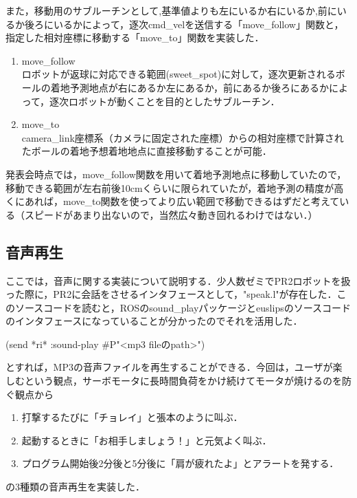 \documentclass[10pt, oneside, titlepage]{ltjarticle}  %
\begin{document}
  また，移動用のサブルーチンとして,基準値よりも左にいるか右にいるか,前にいるか後ろにいるかによって，逐次cmd\_velを送信する「move\_follow」関数と，指定した相対座標に移動する「move\_to」関数を実装した．
  \begin{enumerate}
    \item move\_follow \\
      ロボットが返球に対応できる範囲(sweet\_spot)に対して，逐次更新されるボールの着地予測地点が右にあるか左にあるか，前にあるか後ろにあるかによって，逐次ロボットが動くことを目的としたサブルーチン．
      
    \item move\_to \\
      camera\_link座標系（カメラに固定された座標）からの相対座標で計算されたボールの着地予想着地地点に直接移動することが可能．
  \end{enumerate}

  発表会時点では，move\_follow関数を用いて着地予測地点に移動していたので，移動できる範囲が左右前後10cmくらいに限られていたが，着地予測の精度が高くにあれば，move\_to関数を使ってより広い範囲で移動できるはずだと考えている（スピードがあまり出ないので，当然広々動き回れるわけではない．）

  \subsection{音声再生}
  ここでは，音声に関する実装について説明する．少人数ゼミでPR2ロボットを扱った際に，PR2に会話をさせるインタフェースとして，"speak.l"が存在した\cite{sound}．このソースコードを読むと，ROSのsound\_playパッケージとeuslipsのソースコードのインタフェースになっていることが分かったのでそれを活用した．

  (send *ri* :sound-play \#P"<mp3 fileのpath>")

  とすれば，MP3の音声ファイルを再生することができる．今回は，ユーザが楽しむという観点，サーボモータに長時間負荷をかけ続けてモータが焼けるのを防ぐ観点から
  \begin{enumerate}
    \item 打撃するたびに「チョレイ」と張本のように叫ぶ．
    \item 起動するときに「お相手しましょう！」と元気よく叫ぶ．
    \item プログラム開始後2分後と5分後に「肩が疲れたよ」とアラートを発する．
  \end{enumerate}
  の3種類の音声再生を実装した．
\end{document}
